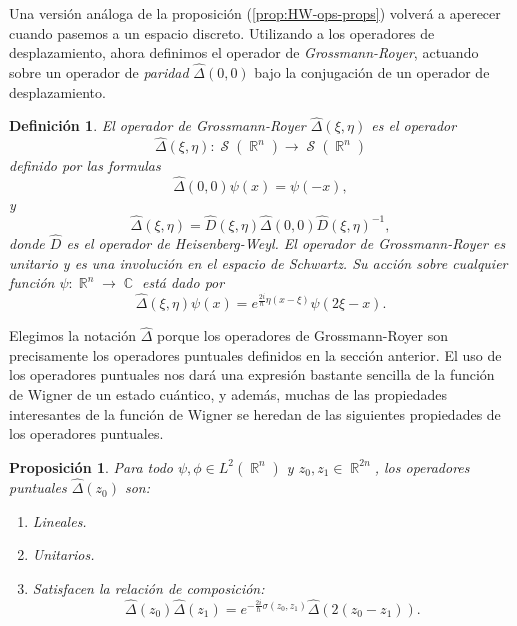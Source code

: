 \documentclass[a4paper]{report}
\DeclareMathOperator{\R}{\mathbb{R}}
\DeclareMathOperator{\C}{\mathbb{C}}
\DeclareMathOperator{\Sz}{\mathcal S}
\newtheorem{definition}{Definición}
\newtheorem{proposition}{Proposición}
\begin{document}
  Una versión análoga de la proposición
  (\ref{prop:HW-ops-props}) volverá a aperecer cuando
  pasemos a un espacio discreto. Utilizando a los operadores
  de desplazamiento, ahora definimos el operador de
  \textit{Grossmann-Royer}, actuando sobre un operador de
  \textit{paridad} $\hat \Delta(0,0)$ bajo la conjugación de
  un operador de desplazamiento.
  \begin{definition}
    El operador de Grossmann-Royer $\hat{\Delta}(\xi,\eta)$
    es el operador 
    \begin{equation}
      \hat{\Delta}(\xi,\eta) : \Sz(\R^{n}) \to \Sz(\R^{n})
    \end{equation} 
    definido por las formulas 
    \begin{equation}
      \hat{\Delta}(0,0)\psi(x)
      = \psi(-x),
    \end{equation}
    y
    \begin{equation}
      \hat{\Delta}(\xi,\eta)
      = \hat{D}(\xi,\eta) \hat{\Delta}(0,0)
      \hat{D}(\xi,\eta)^{-1},
    \end{equation} 
    donde $\hat D$ es el operador de Heisenberg-Weyl. El
    operador de Grossmann-Royer es unitario y es una
    involución en el espacio de Schwartz. Su acción sobre
    cualquier función $\psi : \R^{n} \to \C$ está dado por
    \begin{equation}
      \hat{\Delta}(\xi,\eta)\psi(x)
      = e^{\frac{2i}{\hbar} \eta (x - \xi)}\psi(2\xi - x).
    \end{equation} 
  \end{definition}
  Elegimos la notación $\hat \Delta$ porque los operadores
  de Grossmann-Royer son precisamente los operadores
  puntuales definidos en la sección anterior. El uso de los
  operadores puntuales nos dará una expresión bastante
  sencilla de la función de Wigner de un estado cuántico, y
  además, muchas de las propiedades interesantes de la
  función de Wigner se heredan de las siguientes propiedades
  de los operadores puntuales.
  \begin{proposition}
    Para todo $\psi,\phi \in L^2(\R^{n})$ y $z_0,z_1 \in
    \R^{2n}$, los operadores puntuales $\hat \Delta(z_0)$
    son:
    \begin{enumerate}
      \item Lineales.
      \item Unitarios.
      \item Satisfacen la relación de composición:
        \begin{equation}
          \hat\Delta(z_0)\hat\Delta(z_1)
          = e^{-\frac{2i}{\hbar} \sigma(z_0,z_1)}
          \hat\Delta(2(z_0-z_1)).
        \end{equation}
    \end{enumerate}
  \end{proposition}
\end{document}
